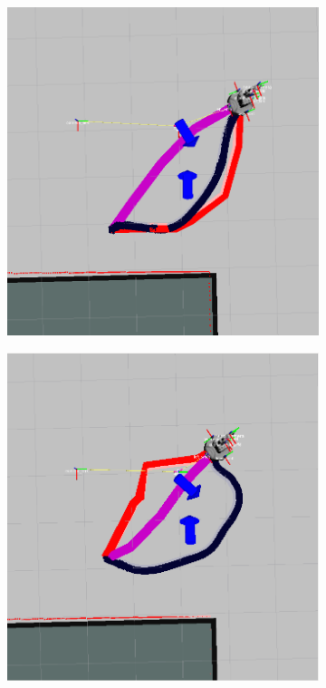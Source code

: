 \documentclass[letterpaper, 10 pt, conference]{ieeeconf}
\begin{document}
			\begin{figure}[tbh]
	\centering
      \begin{subfigure}[b]{0.42\columnwidth}
    \includegraphics[scale=0.15]{images/real_good2.png}
    \caption{}
    \label{fig:res_real1}
  \end{subfigure}
  \hspace{10mm}
  \begin{subfigure}[b]{0.42\columnwidth}
  \hspace{4mm}
    \includegraphics[scale=0.15]{images/real_reasonable3.png}

\end{subfigure}
\end{figure}
\end{document}
